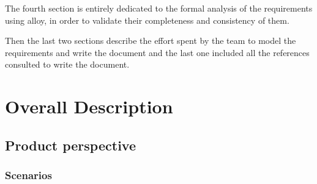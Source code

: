 \documentclass{Configuration_Files/PoliMi3i_thesis}
\begin{document}
The fourth section is entirely dedicated to the formal analysis of the requirements using alloy, in order to validate their completeness and consistency of them. 

Then the last two sections describe the effort spent by the team to model the requirements and write the document and the last one included all the references consulted to write the document. 
\chapter{Overall Description}

\section{Product perspective}

\subsection{Scenarios}
\end{document}
